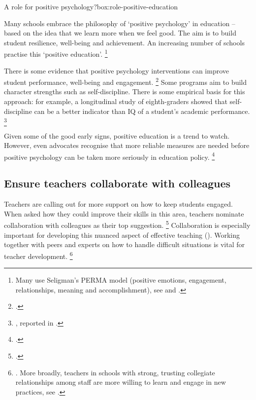 \documentclass{grattan}
\begin{document}
\begin{smallbox}{A role for positive psychology?}{box:role-positive-education}

Many schools embrace the philosophy of `positive psychology' in education -- based on the idea that we learn more when we feel good. The aim is to build student resilience, well-being and achievement. An increasing number of schools practise this `positive education'.%
    \footnote{Many use Seligman's PERMA model (positive emotions, engagement, relationships, meaning and accomplishment), see \textcite{Waters2011ReviewSchoolBased} and \textcite{Seligman2011FlourishVisionaryNew}.}

There is some evidence that positive psychology interventions can improve student performance, well-being and engagement.%
    \footcites{Durlak2011ImpactEnhancingStudents}{Waters2011ReviewSchoolBased} Some programs aim to build character strengths such as self-discipline. There is some empirical basis for this approach: for example, a longitudinal study of eighth-graders showed that self-discipline can be a better indicator than IQ of a student's academic performance.%
    \footnote{\textcite{DuckSeligman2005SelfDisciolineOutdoes}, reported in \textcite{Waters2011ReviewSchoolBased}.}


Given some of the good early signs, positive education is a trend to watch. However, even advocates recognise that more reliable measures are needed before positive psychology can be taken more seriously in education policy.%
    \footcite{White2016WhyWontItStick}
\end{smallbox}

\CenturyFootnote

\subsection{Ensure teachers collaborate with colleagues}\label{subsubsec:ensure-teachers-collaborate}
Teachers are calling out for more support on how to keep students engaged. When asked how they could improve their skills in this area, teachers nominate collaboration with colleagues as their top suggestion.%
    \footcite{Sullivan2014PunishThemEngage}
Collaboration is especially important for developing this nuanced aspect of effective teaching (). Working together with peers and experts on how to handle difficult situations is vital for teacher development.%
    \footnote{\textcites{Epstein2008ReducingBehaviorProblems}{Hough2011CharacteristicsEffectiveProfessional}. More broadly, teachers in schools with strong, trusting collegiate relationships among staff are more willing to learn and engage in new practices, see \textcite{Epstein2008ReducingBehaviorProblems}.}
\end{document}
